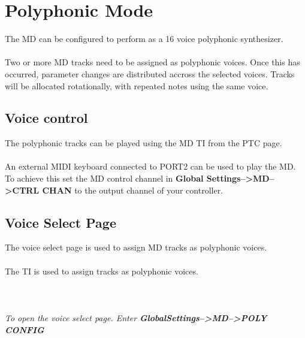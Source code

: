\chapter{Polyphonic Mode}
The MD can be configured to perform as a 16 voice polyphonic synthesizer.\\
\\
Two or more MD tracks need to be assigned as polyphonic voices. Once this has occurred, parameter changes are distributed accross the selected voices. Tracks will be allocated rotationally, with repeated notes using the same voice. 

\section{Voice control}
The polyphonic tracks can be played using the MD TI from the PTC page.\\
\\An external MIDI keyboard connected to PORT2 can be used to play the MD.
To achieve this set the MD control channel in \textbf{Global Settings-->MD-->CTRL CHAN} to the output channel of your controller.

\section{Voice Select Page}
The voice select page is used to assign MD tracks as polyphonic voices.\\\\
The TI is used to assign tracks as polyphonic voices.\\\\
\\\\
\textit{To open the voice select page. Enter \textbf{GlobalSettings-->MD-->POLY CONFIG}}
